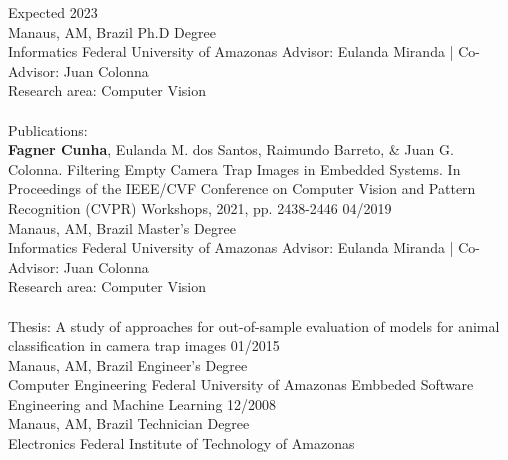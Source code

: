 \documentclass[10pt]{developercv} %
\begin{document}
\begin{entrylist}
  \entry
  {Expected 2023\\\footnotesize{Manaus, AM, Brazil}}
  {Ph.D Degree\\Informatics}
  {Federal University of Amazonas}
  {Advisor: Eulanda Miranda | Co-Advisor: Juan Colonna\\
  Research area: Computer Vision\\\\
  Publications:\\
  \textbf{Fagner Cunha}, Eulanda M. dos Santos, Raimundo Barreto, \& Juan G. 
Colonna. Filtering Empty Camera Trap Images in Embedded Systems. In Proceedings 
of the IEEE/CVF Conference on Computer Vision and Pattern 
Recognition (CVPR) Workshops, 2021, pp. 2438-2446}
  \entry
  {04/2019\\\footnotesize{Manaus, AM, Brazil}}
  {Master's Degree\\Informatics}
  {Federal University of Amazonas}
  {Advisor: Eulanda Miranda | Co-Advisor: Juan Colonna\\
  Research area: Computer Vision\\\\
 Thesis: A study of approaches for out-of-sample evaluation of models for 
animal classification in camera trap images}
  \entry
  {01/2015\\\footnotesize{Manaus, AM, Brazil}}
  {Engineer's Degree\\Computer Engineering}
  {Federal University of Amazonas}
  {Embbeded Software Engineering and Machine Learning}
  \entry
  {12/2008\\\footnotesize{Manaus, AM, Brazil}}
  {Technician Degree\\Electronics}
  {Federal Institute of Technology of Amazonas}
  {}
\end{entrylist}



\end{document}
